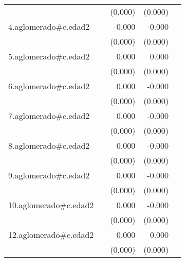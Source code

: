 {\begin{longtable}{l*{4}{D{.}{.}{-1}}}
            &                     &     (0.000)         &     (0.000)         &                     \\
\addlinespace
4.aglomerado#c.edad2&                     &      -0.000         &      -0.000\sym{***}&                     \\
            &                     &     (0.000)         &     (0.000)         &                     \\
\addlinespace
5.aglomerado#c.edad2&                     &       0.000\sym{*}  &       0.000         &                     \\
            &                     &     (0.000)         &     (0.000)         &                     \\
\addlinespace
6.aglomerado#c.edad2&                     &       0.000         &      -0.000         &                     \\
            &                     &     (0.000)         &     (0.000)         &                     \\
\addlinespace
7.aglomerado#c.edad2&                     &       0.000         &      -0.000         &                     \\
            &                     &     (0.000)         &     (0.000)         &                     \\
\addlinespace
8.aglomerado#c.edad2&                     &       0.000         &      -0.000         &                     \\
            &                     &     (0.000)         &     (0.000)         &                     \\
\addlinespace
9.aglomerado#c.edad2&                     &       0.000         &      -0.000\sym{*}  &                     \\
            &                     &     (0.000)         &     (0.000)         &                     \\
\addlinespace
10.aglomerado#c.edad2&                     &       0.000         &      -0.000         &                     \\
            &                     &     (0.000)         &     (0.000)         &                     \\
\addlinespace
12.aglomerado#c.edad2&                     &       0.000\sym{**} &       0.000         &                     \\
            &                     &     (0.000)         &     (0.000)         &                     \\

\end{longtable}}
